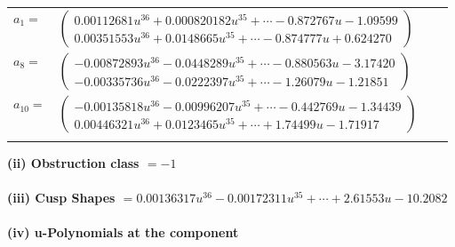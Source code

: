 \documentclass[1p]{elsarticle_modified}
\theoremstyle{definition}
\begin{document}
\begin{tabular}{m{7pt} m{180pt} m{7pt} m{180pt} }
\flushright $a_{1}=$&$\begin{pmatrix}0.00112681 u^{36}+0.000820182 u^{35}+\cdots-0.872767 u-1.09599\\0.00351553 u^{36}+0.0148665 u^{35}+\cdots-0.874777 u+0.624270\end{pmatrix}$ \\
\flushright $a_{8}=$&$\begin{pmatrix}-0.00872893 u^{36}-0.0448289 u^{35}+\cdots-0.880563 u-3.17420\\-0.00335736 u^{36}-0.0222397 u^{35}+\cdots-1.26079 u-1.21851\end{pmatrix}$ \\
\flushright $a_{10}=$&$\begin{pmatrix}-0.00135818 u^{36}-0.00996207 u^{35}+\cdots-0.442769 u-1.34439\\0.00446321 u^{36}+0.0123465 u^{35}+\cdots+1.74499 u-1.71917\end{pmatrix}$\\&\end{tabular}
\flushleft \textbf{(ii) Obstruction class $= -1$}\\~\\
\flushleft \textbf{(iii) Cusp Shapes $= 0.00136317 u^{36}-0.00172311 u^{35}+\cdots+2.61553 u-10.2082$}\\~\\
\newpage\renewcommand{\arraystretch}{1}
\flushleft \textbf{(iv) u-Polynomials at the component}\newline \\
\end{document}
